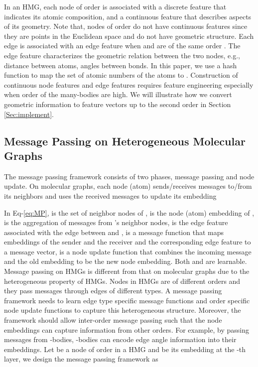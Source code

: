 \documentclass[conference]{IEEEtran}
\begin{document}
In an HMG, each node  of order  is associated with a discrete feature  that indicates its atomic composition, and a continuous feature  that describes aspects of its geometry. Note that, nodes of order  do not have continuous features since they are points in the Euclidean space and do not have geometric structure. Each edge  is associated with an edge feature  when  and  are of the same order . The edge feature characterizes the geometric relation between the two nodes, e.g., distance between atoms, angles between bonds. In this paper, we use a hash function to map the set of atomic numbers of the atoms to . Construction of continuous node features and edge features requires feature engineering especially when order of the many-bodies are high. We will illustrate how we convert geometric information to feature vectors up to the second order in Section \ref{Sec:implement}.

\subsection{Message Passing on Heterogeneous Molecular Graphs} 
The message passing framework consists of two phases, message passing and node update. On molecular graphs, each node (atom)  sends/receives messages to/from its neighbors and uses the received messages to update its embedding

In Eq-\ref{eq:MP},  is the set of neighbor nodes of ,  is the node (atom) embedding of ,  is the aggregation of messages from 's neighbor nodes,   is the edge feature associated with the edge between  and ,  is a message function that maps embeddings of the sender and the receiver and the corresponding edge feature to a message vector,  is a node update function that combines the incoming message and the old embedding to be the new node embedding. Both  and  are learnable. Message passing on HMGs is different from that on molecular graphs due to the heterogeneous property of HMGs. Nodes in HMGs are of different orders and they pass messages through edges of different types. A message passing framework needs to learn edge type specific message functions and order specific node update functions to capture this heterogeneous structure. Moreover, the framework should allow inter-order message passing such that the node embeddings can capture information from other orders. For example, by passing messages from -bodies, -bodies can encode edge angle information into their embeddings. Let  be a node of order  in a HMG and  be its embedding at the -th layer, we design the message passing framework as
\end{document}
